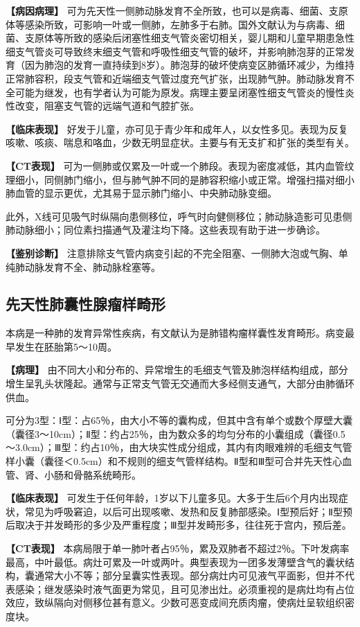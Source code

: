 \textbf{【病因病理】}
可为先天性一侧肺动脉发育不全所致，也可以是病毒、细菌、支原体等感染所致，可影响一叶或一侧肺，左肺多于右肺。国外文献认为与病毒、细菌、支原体等所致的感染后闭塞性细支气管炎密切相关，婴儿期和儿童早期患急性细支气管炎可导致终末细支气管和呼吸性细支气管的破坏，并影响肺泡芽的正常发育（因为肺泡的发育一直持续到8岁）。肺泡芽的破坏使病变区肺循环减少，为维持正常肺容积，段支气管和近端细支气管过度充气扩张，出现肺气肿。肺动脉发育不全可能为继发，也有学者认为可能为原发。病理主要呈闭塞性细支气管炎的慢性炎性改变，阻塞支气管的远端气道和气腔扩张。

\textbf{【临床表现】}
好发于儿童，亦可见于青少年和成年人，以女性多见。表现为反复咳嗽、咳痰、喘息和咯血，少数无明显症状。主要与有无支扩和扩张的类型有关。

\textbf{【CT表现】}
可为一侧肺或仅累及一叶或一个肺段。表现为密度减低，其内血管纹理细小，同侧肺门缩小，但与肺气肿不同的是肺容积缩小或正常。增强扫描对细小肺血管的显示更优，尤其易于显示肺门缩小、中央肺动脉变细。

此外，X线可见吸气时纵隔向患侧移位，呼气时向健侧移位；肺动脉造影可见患侧肺动脉细小；同位素扫描通气及灌注均下降。这些表现有助于进一步确诊。

\textbf{【鉴别诊断】}
注意排除支气管内病变引起的不完全阻塞、一侧肺大泡或气胸、单纯肺动脉发育不全、肺动脉栓塞等。

\subsection{先天性肺囊性腺瘤样畸形}

本病是一种肺的发育异常性疾病，有文献认为是肺错构瘤样囊性发育畸形。病变最早发生在胚胎第5～10周。

\textbf{【病理】}
由不同大小和分布的、异常增生的毛细支气管及肺泡样结构组成，部分增生呈乳头状隆起。通常与正常支气管无交通而大多经侧支通气，大部分由肺循环供血。

可分为3型：Ⅰ型：占65％，由大小不等的囊构成，但其中含有单个或数个厚壁大囊（囊径3～10cm）；Ⅱ型：约占25％，由为数众多的均匀分布的小囊组成（囊径0.5～3.0cm）；Ⅲ型：约占10％，由大块实性成分组成，其内有肉眼难辨的毛细支气管样小囊（囊径＜0.5cm）和不规则的细支气管样结构。Ⅱ型和Ⅲ型可合并先天性心血管、肾、小肠和骨骼系统畸形。

\textbf{【临床表现】}
可发生于任何年龄，1岁以下儿童多见。大多于生后6个月内出现症状，常见为呼吸窘迫，以后可出现咳嗽、发热和反复肺部感染。Ⅰ型预后好；Ⅱ型预后取决于并发畸形的多少及严重程度；Ⅲ型并发畸形多，往往死于宫内，预后差。

\textbf{【CT表现】}
本病局限于单一肺叶者占95％，累及双肺者不超过2％。下叶发病率最高，中叶最低。病灶可累及一叶或两叶。典型表现为一团多发薄壁含气的囊状结构，囊通常大小不等；部分呈囊实性表现。部分病灶内可见液气平面影，但并不代表感染；继发感染时液气面更为常见，且可见渗出灶。必须重视的是病灶均有占位效应，致纵隔向对侧移位甚有意义。少数可恶变成间充质肉瘤，使病灶呈软组织密度块。

